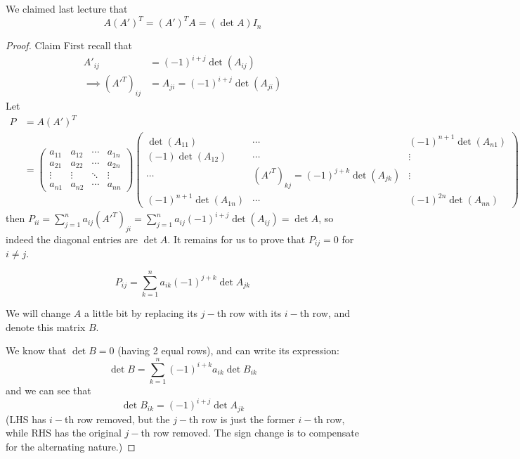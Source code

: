 \begin{recall}
    We claimed last lecture that \[
        A (A')^T = (A')^T A = (\det A) I_n
    \]
\end{recall}

\begin{proof} {Claim}
    First recall that \begin{align*}
        A'_{ij}              & = (-1)^{i+j} \det(A_{ij})          \\
        \implies (A'^T)_{ij} & = A_{ji} = (-1)^{i+j} \det(A_{ji})
    \end{align*}
    Let \begin{align*}
        P & = A (A')^T                          \\
          & = \begin{pmatrix}
                  a_{11} & a_{12} & \cdots & a_{1n} \\
                  a_{21} & a_{22} & \cdots & a_{2n} \\
                  \vdots & \vdots & \ddots & \vdots \\
                  a_{n1} & a_{n2} & \cdots & a_{nn}
              \end{pmatrix}
        \begin{pmatrix}
            \det(A_{11})           & \cdots                                & (-1)^{n+1} \det (A_{n1}) \\
            (-1)\det (A_{12})      & \cdots                                & \vdots                   \\
            \cdots                 & (A'^T)_{kj} = (-1)^{j+k}\det (A_{jk}) & \vdots                   \\
            (-1)^{n+1}\det(A_{1n}) & \cdots                                & (-1)^{2n}\det(A_{nn})
        \end{pmatrix}
    \end{align*}
    then \(P_{ii} = \sum_{j=1}^{n} a_{ij}(A'^T)_{ji} = \sum_{j=1}^{n}a_{ij} (-1)^{i+j}\det(A_{ij}) = \det A\), so indeed the diagonal entries are \(\det A\). It remains for us to prove that \(P_{ij} = 0\) for \(i \neq j\).

    \[
        P_{ij} = \sum_{k=1}^{n} a_{ik} (-1)^{j+k}\det A_{jk}
    \]

    We will change \(A\) a little bit by replacing its \(j-\)th row with its \(i-\)th row, and denote this matrix \(B\).

    We know that \(\det B = 0\) (having 2 equal rows), and can write its expression:
    \[
        \det B = \sum_{k=1}^{n}(-1)^{i+k}a_{ik}\det B_{ik}
    \]
    and we can see that \[
        \det B_{ik} = (-1)^{i+j}\det A_{jk}
    \]
    (LHS has \(i-\)th row removed, but the \(j-\)th row is just the former \(i-\)th row, while RHS has the original \(j-\)th row removed. The sign change is to compensate for the alternating nature.)


\end{proof}
